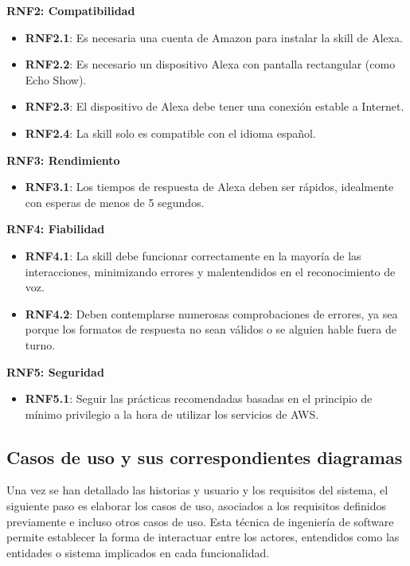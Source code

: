 \textbf{RNF2: Compatibilidad}
\begin{itemize}
    \item \textbf{RNF2.1}: Es necesaria una cuenta de Amazon para instalar la skill de Alexa.
    \item \textbf{RNF2.2}: Es necesario un dispositivo Alexa con pantalla rectangular (como Echo Show).
    \item \textbf{RNF2.3}: El dispositivo de Alexa debe tener una conexión estable a Internet.
    \item \textbf{RNF2.4}: La skill solo es compatible con el idioma español.
\end{itemize}

\textbf{RNF3: Rendimiento}
\begin{itemize}
    \item \textbf{RNF3.1}: Los tiempos de respuesta de Alexa deben ser rápidos, idealmente con esperas de menos de 5 segundos.
\end{itemize}

\textbf{RNF4: Fiabilidad}
\begin{itemize}
    \item \textbf{RNF4.1}: La skill debe funcionar correctamente en la mayoría de las interacciones, minimizando errores y malentendidos en el reconocimiento de voz.
    \item \textbf{RNF4.2}: Deben contemplarse numerosas comprobaciones de errores, ya sea porque los formatos de respuesta no sean válidos o se alguien hable fuera de turno.
\end{itemize}

\textbf{RNF5: Seguridad}
\begin{itemize}
	\item \textbf{RNF5.1}: Seguir las prácticas recomendadas basadas en el principio de mínimo privilegio a la hora de utilizar los servicios de AWS.
\end{itemize}

\newpage
\subsection{Casos de uso y sus correspondientes diagramas}

Una vez se han detallado las historias y usuario y los requisitos del sistema, el siguiente paso es elaborar los casos de uso, asociados a los requisitos definidos previamente e incluso otros casos de uso. Esta técnica de ingeniería de software permite establecer la forma de interactuar entre los actores, entendidos como las entidades o sistema implicados en cada funcionalidad.  

